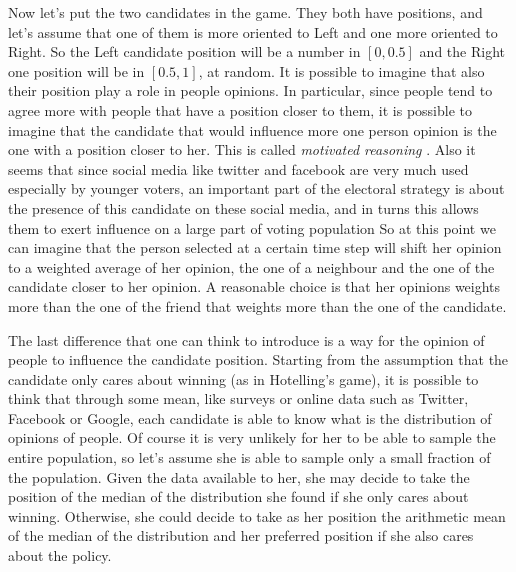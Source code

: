 \documentclass[11pt,a4paper,twocolumn]{article}
\begin{document}
Now let's put the two candidates in the game. They both have positions, and let's assume that one of them is more oriented to Left and one more oriented to Right. So the Left candidate position will be a number in $[0,0.5]$ and the Right one position will be in $[0.5,1]$, at random. 
It is possible to imagine that also their position play a role in people opinions. In particular, since people tend to agree more with people that have a position closer to them, it is possible to imagine that the candidate that would influence more one person opinion is the one with a position closer to her. This is called \emph{motivated reasoning} \cite{motherjones,kunda}. 
Also it seems that since social media like twitter and facebook are very much used especially by younger voters, an important part of the electoral strategy is about the presence of this candidate on these social media, and in turns this allows them to exert influence on a large part of voting population \cite{guardian,quartz,independent}
So at this point we can imagine that the person selected at a certain time step will shift her opinion to a weighted average of her opinion, the one of a neighbour and the one of the candidate closer to her opinion. A reasonable choice is that her opinions weights more than the one of the friend that weights more than the one of the candidate.

The last difference that one can think to introduce is a way for the opinion of people to influence the candidate position.
Starting from the assumption that the candidate only cares about winning (as in Hotelling's game), it is possible to think that through some mean, like surveys or online data such as Twitter, Facebook or Google, each candidate is able to know what is the distribution of opinions of people. Of course it is very unlikely for her to be able to sample the entire population, so let's assume she is able to sample only a small fraction of the population. Given the data available to her, she may decide to take the position of the median of the distribution she found if she only cares about winning. Otherwise, she could decide to take as her position the arithmetic mean of the median of the distribution and her preferred position if she also cares about the policy.
\end{document}
